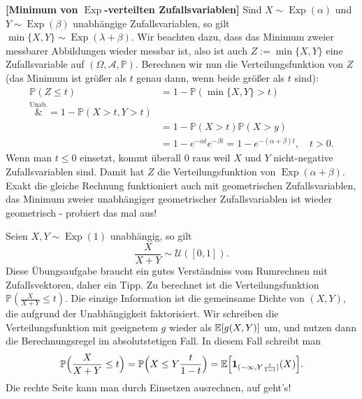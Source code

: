 \begin{beispiel}
 \textbf{[Minimum von $\operatorname{Exp}$-verteilten Zufallsvariablen]}
Sind $X \sim \operatorname{Exp}(\alpha)$ und $Y\sim \operatorname{Exp}(\beta)$ unabh\"angige Zufallsvariablen, so gilt $\min\{X,Y\}\sim \operatorname{Exp}(\lambda+\beta)$. Wir beachten dazu, dass das Minimum zweier messbarer Abbildungen wieder messbar ist, also ist auch $Z:=\min\{X,Y\}$ eine Zufallsvariable auf $(\Omega, \mathcal A, \mathbb P)$. Berechnen wir nun die Verteilungsfunktion von $Z$ (das Minimum ist gr\"o\ss er als $t$ genau dann, wenn beide gr\"o\ss er als $t$ sind):
\begin{align*}
	\mathbb P(Z\leq t)&=1-\mathbb P(\min \{X,Y\}>t)\\
	\overset{\text{Unab.}}&{=}1-\mathbb P(X>t, Y>t)\\
	&=1-\mathbb P(X>t)\mathbb P(X>y)\\
	&=1- e^{-\alpha t} e^{-\beta t}=1-e^{-(\alpha+\beta)t},\quad t> 0.
\end{align*}
Wenn man $t\leq 0$ einsetzt, kommt \"uberall $0$ raus weil $X$ und $Y$ nicht-negative Zufallsvariablen sind. Damit hat $Z$ die Verteilungsfunktion von $\operatorname{Exp}(\alpha+\beta)$. Exakt die gleiche Rechnung funktioniert auch mit geometrischen Zufallsvariablen, das Minimum zweier unabh\"angiger geometrischer Zufallsvariablen ist wieder geometrisch - probiert das mal aus!
\end{beispiel}

\begin{beispiel}
	Seien $X,Y\sim \operatorname{Exp}(1)$ unabh\"angig, so gilt $$\frac{X}{X+Y}\sim \mathcal U([0,1]).$$
	Diese \"Ubungsaufgabe braucht ein gutes Verst\"andniss vom Rumrechnen mit Zufallsvektoren, daher ein Tipp. Zu berechnet ist die Verteilungsfunktion $\mathbb P(\frac{X}{X+Y}\leq t)$. Die einzige Information ist die gemeinsame Dichte von $(X,Y)$, die aufgrund der Unabh\"angigkeit faktorisiert. Wir schreiben die Verteilungsfunktion mit geeignetem $g$ wieder als $\mathbb{E}[g(X,Y)]$ um, und nutzen dann die Berechnungsregel im absolutstetigen Fall. In diesem Fall schreibt man
	\begin{align*}
		\mathbb P\Big(\frac{X}{X+Y}\leq t\Big)=\mathbb P\Big(X\leq Y \frac{t}{1-t}\Big)=\mathbb{E}\Big[\mathbf 1_{(-\infty, Y\frac{t}{1-t}]}(X)\Big].
	\end{align*}
	Die rechte Seite kann man durch Einsetzen ausrechnen, auf geht's! 
\end{beispiel}

